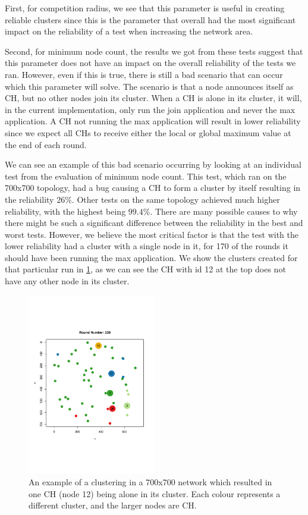First, for competition radius, we see that this parameter is useful in creating reliable clusters since this is the parameter that overall had the most significant impact on the reliability of a test when increasing the network area. 

Second, for minimum node count, the results we got from these tests suggest that this parameter does not have an impact on the overall reliability of the tests we ran. However, even if this is true, there is still a bad scenario that can occur which this parameter will solve. The scenario is that a node announces itself as CH, but no other nodes join its cluster. When a CH is alone in its cluster, it will, in the current implementation, only run the join application and never the max application. A CH not running the max application will result in lower reliability since we expect all CHs to receive either the local or global maximum value at the end of each round.

We can see an example of this bad scenario occurring by looking at an individual test from the evaluation of minimum node count. This test, which ran on the 700x700 topology, had a bug causing a CH to form a cluster by itself resulting in the reliability $26\%$. Other tests on the same topology achieved much higher reliability, with the highest being $99.4\%$. There are many possible causes to why there might be such a significant difference between the reliability in the best and worst tests. However, we believe the most critical factor is that the test with the lower reliability had a cluster with a single node in it, for 170 of the rounds it should have been running the max application. We show the clusters created for that particular run in \cref{fig:min-node-count-example}, as we can see the CH with id 12 at the top does not have any other node in its cluster.

\begin{figure}[bt]
    \centering
    \includegraphics[width=0.5\textwidth]{figure/Results/Discussion/MinNodeCountExample.pdf}
    \caption{An example of a clustering in a 700x700 network which resulted in one CH (node 12) being alone in its cluster. Each colour represents a different cluster, and the larger nodes are CH.}
    \label{fig:min-node-count-example}
\end{figure}


